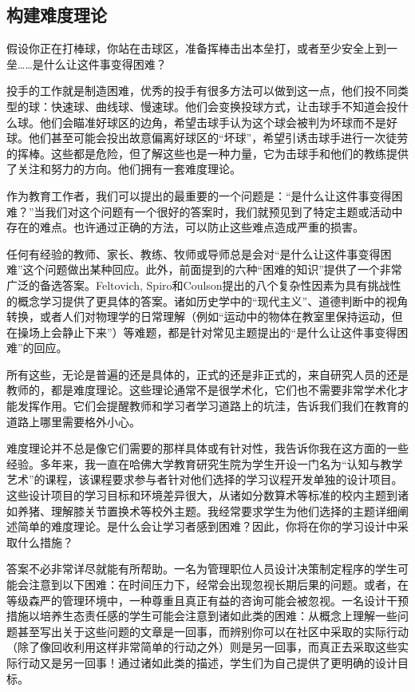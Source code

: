 \subsection*{构建难度理论}

假设你正在打棒球，你站在击球区，准备挥棒击出本垒打，或者至少安全上到一垒……是什么让这件事变得困难？

投手的工作就是制造困难，优秀的投手有很多方法可以做到这一点，他们投不同类型的球：快速球、曲线球、慢速球。他们会变换投球方式，让击球手不知道会投什么球。他们会瞄准好球区的边角，希望击球手认为这个球会被判为坏球而不是好球。他们甚至可能会投出故意偏离好球区的“坏球”，希望引诱击球手进行一次徒劳的挥棒。这些都是危险，但了解这些也是一种力量，它为击球手和他们的教练提供了关注和努力的方向。他们拥有一套难度理论。

作为教育工作者，我们可以提出的最重要的一个问题是：“是什么让这件事变得困难？”当我们对这个问题有一个很好的答案时，我们就预见到了特定主题或活动中存在的难点。也许通过正确的方法，可以防止这些难点造成严重的损害。

任何有经验的教师、家长、教练、牧师或导师总是会对“是什么让这件事变得困难”这个问题做出某种回应。此外，前面提到的六种“困难的知识”提供了一个非常广泛的备选答案。Feltovich, Spiro和Coulson提出的八个复杂性因素为具有挑战性的概念学习提供了更具体的答案。诸如历史学中的“现代主义”、道德判断中的视角转换，或者人们对物理学的日常理解（例如“运动中的物体在教室里保持运动，但在操场上会静止下来”）等难题，都是针对常见主题提出的“是什么让这件事变得困难”的回应。

所有这些，无论是普遍的还是具体的，正式的还是非正式的，来自研究人员的还是教师的，都是难度理论。这些理论通常不是很学术化，它们也不需要非常学术化才能发挥作用。它们会提醒教师和学习者学习道路上的坑洼，告诉我们我们在教育的道路上哪里需要格外小心。

难度理论并不总是像它们需要的那样具体或有针对性，我告诉你我在这方面的一些经验。多年来，我一直在哈佛大学教育研究生院为学生开设一门名为“认知与教学艺术”的课程，该课程要求参与者针对他们选择的学习议程开发单独的设计项目。这些设计项目的学习目标和环境差异很大，从诸如分数算术等标准的校内主题到诸如养猪、理解膝关节置换术等校外主题。我经常要求学生为他们选择的主题详细阐述简单的难度理论。是什么会让学习者感到困难？因此，你将在你的学习设计中采取什么措施？

答案不必非常详尽就能有所帮助。一名为管理职位人员设计决策制定程序的学生可能会注意到以下困难：在时间压力下，经常会出现忽视长期后果的问题。或者，在等级森严的管理环境中，一种尊重且真正有益的咨询可能会被忽视。一名设计干预措施以培养生态责任感的学生可能会注意到诸如此类的困难：从概念上理解一些问题甚至写出关于这些问题的文章是一回事，而辨别你可以在社区中采取的实际行动（除了像回收利用这样非常简单的行动之外）则是另一回事，而真正去采取这些实际行动又是另一回事！通过诸如此类的描述，学生们为自己提供了更明确的设计目标。

